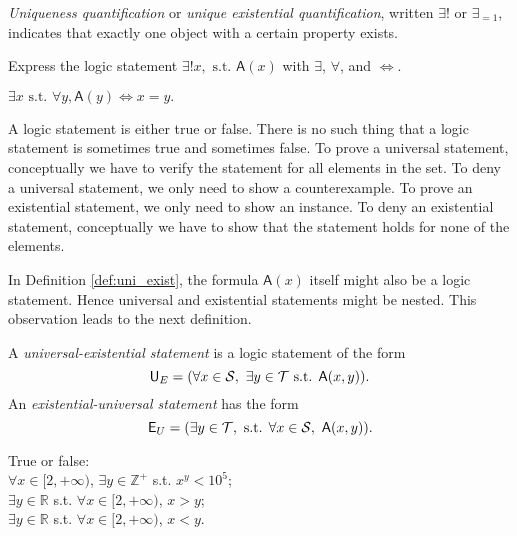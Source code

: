 \begin{defn}
  \emph{Uniqueness quantification}
   or \emph{unique existential quantification},
   written $\exists!$ or $\exists_{=1}$, 
   indicates that exactly one object with a certain property exists.
\end{defn}

\begin{exc}
  Express the logic statement $\exists! x, \text{ s.t. } \mathsf{A}(x)$
   with $\exists$, $\forall$, and $\Leftrightarrow$.
\end{exc}
\begin{solution}
  $\exists x \text{ s.t. }\forall y, \mathsf{A}(y) \Leftrightarrow x=y.$
\end{solution}

 \begin{rem}
A logic statement is either true or false.
There is no such thing that
 a logic statement is sometimes true and sometimes false.
To prove a universal statement,
 conceptually we have to verify the statement
 for all elements in the set.
To deny a universal statement,
 we only need to show a counterexample.
To prove an existential statement,
 we only need to show an instance.
To deny an existential statement,
 conceptually we have to show that the statement holds
 for none of the elements.
 \end{rem}

 \begin{rem}
   In Definition \ref{def:uni_exist},
    the formula $\mathsf{A}(x)$ itself
    might also be a logic statement.
   Hence universal and existential statements
    might be nested.
   This observation leads to the next definition.
 \end{rem}

 \begin{defn}
   A \emph{universal-existential statement} is a logic statement 
   of the form
   \begin{equation}
     \mathsf{U}_E =
     (\forall x\in {\cal S},\ \exists y\in {\cal T}
     \text{ s.t. } \mathsf{A}(x,y)).
   \end{equation}
   An \emph{existential-universal statement} has the form
   \begin{equation}
     \mathsf{E}_U =
     (\exists y\in {\cal T},\text{ s.t. } \forall x\in {\cal S},\ 
     \mathsf{A}(x,y)).
   \end{equation}
 \end{defn}

 \begin{exm}
   True or false:\\
   $\forall x\in[2,+\infty)$, $\exists y\in \mathbb{Z}^+$ s.t. $x^y<10^5$;\\
   $\exists y\in \mathbb{R}$ s.t.
   $\forall x\in[2,+\infty)$, $x>y$;\\
   $\exists y\in \mathbb{R}$ s.t.
   $\forall x\in[2,+\infty)$, $x<y$.
 \end{exm}


